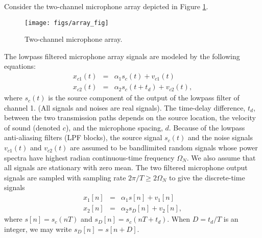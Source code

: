 \documentclass[12pt]{report}
\begin{document}

Consider the two-channel microphone array depicted in Figure \ref{fig:array_fig}.
\begin{figure}[!htb]
	\centering
    \texttt{[image: figs/array\_fig]}
    \caption{Two-channel microphone array. \label{fig:array_fig}}
    \end{figure}
The lowpass filtered microphone array signals are modeled by the following equations:
\begin{subequations}
\begin{eqnarray}
x_{c1}(t)&=&\alpha_1 s_c(t)+v_{c1}(t) \label{eq:1a} \\
x_{c2}(t)&=&\alpha_2 s_c(t+t_d)+v_{c2}(t), \label{eq:1b}
\end{eqnarray}
\end{subequations}
where $s_{c}(t)$ is the source component of the output of the lowpass filter of channel 1. (All signals and noises are real signals). The time-delay difference, $t_{d}$, between the two transmission paths depends on the source location, the velocity of sound (denoted $c$), and the microphone spacing, $d$. Because of the lowpass anti-aliasing filters (LPF blocks), the source signal $s_c(t)$ and the noise signals $v_{c1}(t)$ and $v_{c2}(t)$ are assumed to be bandlimited random signals whose power spectra have highest radian continuous-time frequency $\Omega_N$. We also assume that all signals are stationary with zero mean. The two filtered microphone output signals are sampled with sampling rate $2\pi/T\geq 2\Omega_N$ to give the discrete-time signals
\begin{subequations}
\begin{eqnarray}
x_{1}[n]&=&\alpha_1 s[n]+v_1[n] \label{eq:2a} \\
x_{2}[n]&=&\alpha_2 s_D[n]+v_{2}[n], \label{eq:2b}
\end{eqnarray}
\end{subequations}
where $s[n]=s_c(nT)$ and $s_D[n]=s_{c}(nT+t_d)$.  When $D=t_d/T$  is an integer, we may write $s_D[n]=s[n+D]$.
\end{document}
